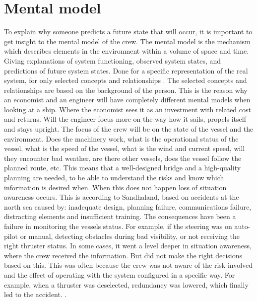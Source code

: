 \section{Mental model}
To explain why someone predicts a future state that will occur, it is important to get insight to the mental model of the crew.
The mental model is the mechanism which describes elements in the environment within a volume of space and time. Giving explanations of system functioning, observed system states, and predictions of future system states. Done for a specific representation of the real system, for only selected concepts and relationships \cite{Kalloniatis2017}. 
The selected concepts and relationships are based on the background of the person. This is the reason why an economist and an engineer will have completely different mental models when looking at a ship. Where the economist sees it as an investment with related cost and returns. Will the engineer focus more on the way how it sails, propels itself and stays upright. 
The focus of the crew will be on the state of the vessel and the environment. Does the machinery work, what is the operational status of the vessel, what is the speed of the vessel, what is the wind and current speed, will they encounter bad weather, are there other vessels, does the vessel follow the planned route, etc. This means that a well-designed bridge and a high-quality planning are needed, to be able to understand the risks and know which information is desired when. 
When this does not happen loss of situation awareness occurs. This is according to Sandhaland, based on accidents at the north sea caused by: inadequate design, planning failure, communications failure, distracting elements and insufficient training. 
The consequences have been a failure in monitoring the vessels status. For example, if the steering was on auto-pilot or manual, detecting obstacles during bad visibility, or not receiving the right thruster status. In some cases, it went a level deeper in situation awareness, where the crew received the information. But did not make the right decisions based on this. This was often because the crew was not aware of the risk involved and the effect of operating with the system configured in a specific way. For example, when a thruster was deselected, redundancy was lowered, which finally led to the accident. \cite{Sandhaland2015}.

